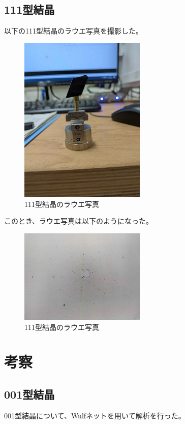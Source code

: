 \documentclass[a4paper,11pt]{jsarticle}
\begin{document}
\subsection{111型結晶}
以下の111型結晶のラウエ写真を撮影した。
\begin{figure}[H]
  \centering
  \includegraphics[width=6cm]{ato.jpg}
  \caption{111型結晶のラウエ写真}
\end{figure}

このとき、ラウエ写真は以下のようになった。
\begin{figure}[H]
  \centering
  \includegraphics[width=6cm]{110.jpg}
  \caption{111型結晶のラウエ写真}
\end{figure}


\section{考察}
\subsection{001型結晶}
001型結晶について、Wulfネットを用いて解析を行った。
\end{document}
